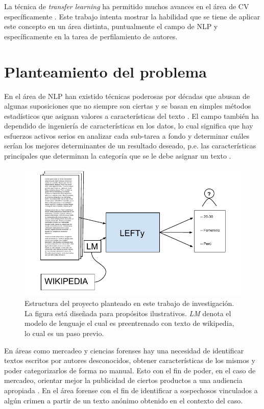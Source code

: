 La técnica de \emph{transfer learning} ha permitido muchos avances en el área de CV específicamente \parencite{hoo2016deep}. Este trabajo intenta mostrar la habilidad que se tiene de aplicar este concepto en un área distinta, puntualmente el campo de NLP y específicamente en la tarea de perfilamiento de autores.

\section{Planteamiento del problema}

En el área de NLP han existido técnicas poderosas por décadas que abusan de algunas suposiciones que no siempre son ciertas y se basan en simples métodos estadísticos que asignan valores a características del texto \parencite{Edmundson1969, kupiec1995trainable}. El campo también ha dependido de ingeniería de características en los datos, lo cual significa que hay esfuerzos activos serios en analizar cada sub-tarea a fondo y determinar cuáles serían los mejores determinantes de un resultado deseado, p.e. las características principales que determinan la categoría que se le debe asignar un texto \parencite{aggarwal2012mining}.

\begin{figure}
\includegraphics[scale=1.0]{Figures/projectstruct.pdf}
\caption{Estructura del proyecto planteado en este trabajo de investigación. La figura está diseñada para propósitos ilustrativos. \textit{LM} denota el modelo de lenguaje el cual es preentrenado con texto de wikipedia, lo cual es un paso previo.}
\label{fig:projstruct}
\end{figure}

En áreas como mercadeo y ciencias forenses hay una necesidad de identificar textos escritos por autores desconocidos, obtener características de los mismos y poder categorizarlos de forma no manual. Esto con el fin de poder, en el caso de mercadeo, orientar mejor la publicidad de ciertos productos a una audiencia apropiada \parencite{aggarwal2012mining}. En el área forense con el fin de identificar a sospechosos vinculados a algún crimen a partir de un texto anónimo obtenido en el contexto del caso.

